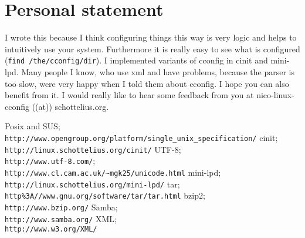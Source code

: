 \documentclass[11pt,a4paper]{article}
\newcommand{\cemail}{nico-linux-cconfig ((at)) schottelius.org}
\begin{document}
\section{Personal statement}
I wrote this because I think configuring things this way is very logic
and helps to intuitively use your system. Furthermore it is really
easy to see what is configured (\verb=find /the/cconfig/dir=). I implemented
variants of cconfig in cinit\cite{cinit} and mini-lpd\cite{mini-lpd}.
Many people I know, who use xml\cite{xml} and have problems, because
the parser is too slow, were very happy when I told them about cconfig.
I hope you can also benefit from it. I would really like to hear some
feedback from you at \cemail.
\appendix
\begin{thebibliography}{666}
 Posix and SUS;\\
\verb=http://www.opengroup.org/platform/single_unix_specification/=
 cinit;\\
\verb=http://linux.schottelius.org/cinit/=
 UTF-8;\\
\verb=http://www.utf-8.com/=;\\
\verb=http://www.cl.cam.ac.uk/~mgk25/unicode.html=
 mini-lpd;\\
\verb=http://linux.schottelius.org/mini-lpd/=
 tar;\\
\verb=http%3A//www.gnu.org/software/tar/tar.html=
 bzip2;\\
\verb=http://www.bzip.org/=
 Samba;\\
\verb=http://www.samba.org/=
 XML;\\
\verb=http://www.w3.org/XML/=
\end{thebibliography}
\end{document}
